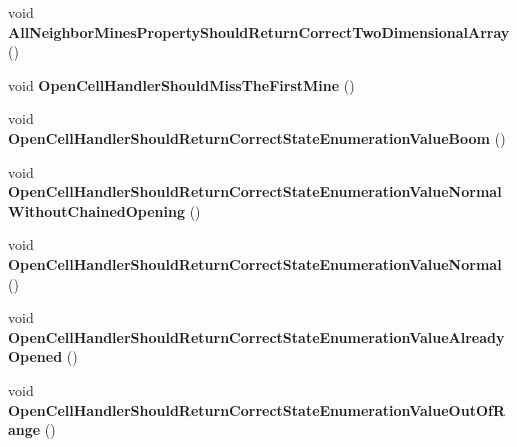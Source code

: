 \begin{DoxyCompactItemize}
\item 
\hypertarget{class_minesweeper_1_1_unit_tests_1_1_game_1_1_minefield_class_tests_a619d46f5e743894b8b2b651c361aafff}{void {\bfseries All\+Neighbor\+Mines\+Property\+Should\+Return\+Correct\+Two\+Dimensional\+Array} ()}\label{class_minesweeper_1_1_unit_tests_1_1_game_1_1_minefield_class_tests_a619d46f5e743894b8b2b651c361aafff}

\item 
\hypertarget{class_minesweeper_1_1_unit_tests_1_1_game_1_1_minefield_class_tests_a5cb5109809a2da50ad015a3c3a334a6e}{void {\bfseries Open\+Cell\+Handler\+Should\+Miss\+The\+First\+Mine} ()}\label{class_minesweeper_1_1_unit_tests_1_1_game_1_1_minefield_class_tests_a5cb5109809a2da50ad015a3c3a334a6e}

\item 
\hypertarget{class_minesweeper_1_1_unit_tests_1_1_game_1_1_minefield_class_tests_a77bc1e8de7adf8b8edaf949507ec0e4a}{void {\bfseries Open\+Cell\+Handler\+Should\+Return\+Correct\+State\+Enumeration\+Value\+Boom} ()}\label{class_minesweeper_1_1_unit_tests_1_1_game_1_1_minefield_class_tests_a77bc1e8de7adf8b8edaf949507ec0e4a}

\item 
\hypertarget{class_minesweeper_1_1_unit_tests_1_1_game_1_1_minefield_class_tests_a4cab3954d245012a721e2a3364a3f471}{void {\bfseries Open\+Cell\+Handler\+Should\+Return\+Correct\+State\+Enumeration\+Value\+Normal\+Without\+Chained\+Opening} ()}\label{class_minesweeper_1_1_unit_tests_1_1_game_1_1_minefield_class_tests_a4cab3954d245012a721e2a3364a3f471}

\item 
\hypertarget{class_minesweeper_1_1_unit_tests_1_1_game_1_1_minefield_class_tests_ac496494fbd371f400aa91a0c12753efe}{void {\bfseries Open\+Cell\+Handler\+Should\+Return\+Correct\+State\+Enumeration\+Value\+Normal} ()}\label{class_minesweeper_1_1_unit_tests_1_1_game_1_1_minefield_class_tests_ac496494fbd371f400aa91a0c12753efe}

\item 
\hypertarget{class_minesweeper_1_1_unit_tests_1_1_game_1_1_minefield_class_tests_a12ca2a92bc3e3f04cfc33fd6a2aa9a70}{void {\bfseries Open\+Cell\+Handler\+Should\+Return\+Correct\+State\+Enumeration\+Value\+Already\+Opened} ()}\label{class_minesweeper_1_1_unit_tests_1_1_game_1_1_minefield_class_tests_a12ca2a92bc3e3f04cfc33fd6a2aa9a70}

\item 
\hypertarget{class_minesweeper_1_1_unit_tests_1_1_game_1_1_minefield_class_tests_a0b40e8aa707d0260c24d07675ddaa427}{void {\bfseries Open\+Cell\+Handler\+Should\+Return\+Correct\+State\+Enumeration\+Value\+Out\+Of\+Range} ()}\label{class_minesweeper_1_1_unit_tests_1_1_game_1_1_minefield_class_tests_a0b40e8aa707d0260c24d07675ddaa427}


\end{DoxyCompactItemize}
